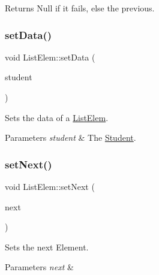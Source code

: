 \begin{DoxyReturn}{Returns}
Null if it fails, else the previous. 
\end{DoxyReturn}
\mbox{\label{class_list_elem_af28aa52ed74728f9ee6f0cc52794b3e8}} 
\subsubsection{\texorpdfstring{set\+Data()}{setData()}}
{\footnotesize\ttfamily void List\+Elem\+::set\+Data (\begin{DoxyParamCaption}\item[{const \hyperlink{class_student}{Student} \&}]{student }\end{DoxyParamCaption})}



Sets the data of a \hyperlink{class_list_elem}{List\+Elem}. 


\begin{DoxyParams}{Parameters}
{\em student} & The \hyperlink{class_student}{Student}. \\
\hline
\end{DoxyParams}
\mbox{\label{class_list_elem_aca66e560d24ac2954f738f52de2e15b3}} 
\subsubsection{\texorpdfstring{set\+Next()}{setNext()}}
{\footnotesize\ttfamily void List\+Elem\+::set\+Next (\begin{DoxyParamCaption}\item[{\hyperlink{class_list_elem}{List\+Elem} $\ast$const}]{next }\end{DoxyParamCaption})}



Sets the next Element. 


\begin{DoxyParams}{Parameters}
{\em next} & \\
\hline
\end{DoxyParams}
\mbox{\label{class_list_elem_aae056f9271098897ce8bf243354cd744}} 
